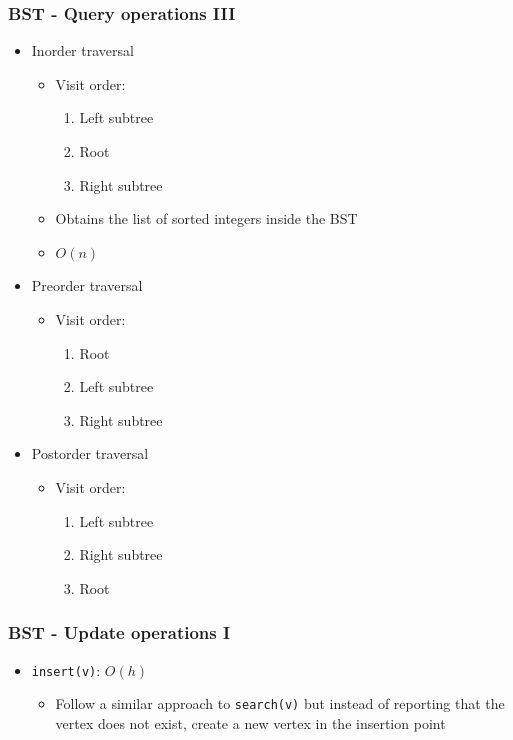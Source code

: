 \documentclass{beamer}
\begin{document}
\begin{frame}[fragile]
\frametitle{BST - Query operations III}
	\begin{itemize}
		\item Inorder traversal
			\begin{itemize}
				\item Visit order:
					\begin{enumerate}
						\item Left subtree
						\item Root
						\item Right subtree
					\end{enumerate}
				\item Obtains the list of sorted integers inside the BST
				\item \color{blue} $O(n)$ \color{black}
			\end{itemize}
		\item Preorder traversal	
			\begin{itemize}
				\item Visit order:
					\begin{enumerate}
						\item Root
						\item Left subtree
						\item Right subtree
					\end{enumerate}
			\end{itemize}
		\item Postorder traversal
			\begin{itemize}
				\item Visit order:
					\begin{enumerate}
						\item Left subtree
						\item Right subtree
						\item Root
					\end{enumerate}
			\end{itemize}
	\end{itemize}
\end{frame}

\begin{frame}[fragile]
\frametitle{BST - Update operations I}
	\begin{itemize}
		\item \verb|insert(v)|: \color{blue} $O(h)$ \color{black}
			\begin{itemize}
				\item Follow a similar approach to \verb|search(v)| but instead of reporting that the vertex does not exist, create a new vertex in the insertion point
			\end{itemize}
	\end{itemize}
\end{frame}
\end{document}
